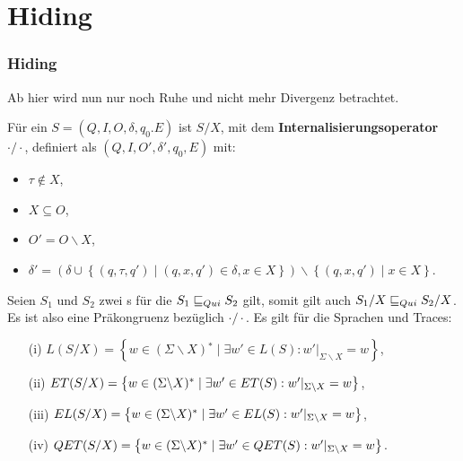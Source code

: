 \section{Hiding}
\begin{frame}
  \frametitle{Hiding}
  Ab hier wird nun nur noch Ruhe und nicht mehr Divergenz betrachtet.
  \begin{Def}[Internalisierungsoperator]
    Für ein \EIO{} $S=(Q,I,O,\delta ,q_0.E)$ ist $S/X$, mit
    dem \textbf{Internalisierungsoperator} $\cdot /\cdot$,
    definiert als $(Q,I,O',\delta ', q_0,E)$ mit:
    \begin{itemize}
      \item $\tau \notin X$,
      \item $X\subseteq O$,
      \item $O'=O\backslash X$,
      \item $\delta '=\left(\delta\cup\left\{(q,\tau ,q')\mid (q,x,q')\in\delta
        ,x\in X\right\}\right)\backslash \left\{(q,x,q')\mid x\in X\right\}$.
    \end{itemize}
  \end{Def}
\end{frame}

\begin{frame}
  \begin{satz}
    Seien $S_1$ und $S_2$ zwei \EIO{}s für die $S_1\sqsubseteq _{Qui} S_2$ gilt, somit gilt
    auch $S_1/X\sqsubseteq _{Qui} S_2/X$. Es ist also \QRel{} eine Präkongruenz bezüglich
    $\cdot /\cdot$. Es gilt für die Sprachen und Traces:
    \begin{itemize}
      \item[(i)] $L(S/X) = \left\{w\in (\Sigma\backslash X){}^*\mid \exists w'\in L(S):
        w'|_{\Sigma\backslash X} = w\right\}$,
      \item[(ii)] $ET{}(S/X) = \left\{w\in (\Sigma\backslash X){}^*\mid \exists
        w'\in ET{}(S): w'|_{\Sigma\backslash X} = w\right\}$,
      \item[(iii)] $EL{}(S/X) = \left\{w\in (\Sigma\backslash X){}^*\mid \exists w'\in
        EL(S): w'|_{\Sigma\backslash X} = w\right\}$,
      \item[(iv)] $QET{}(S/X) = \left\{w\in (\Sigma\backslash X){}^*\mid \exists w'\in
        QET{}(S):w'|_{\Sigma\backslash X}=w\right\}$.
    \end{itemize}
  \end{satz}
\end{frame}

